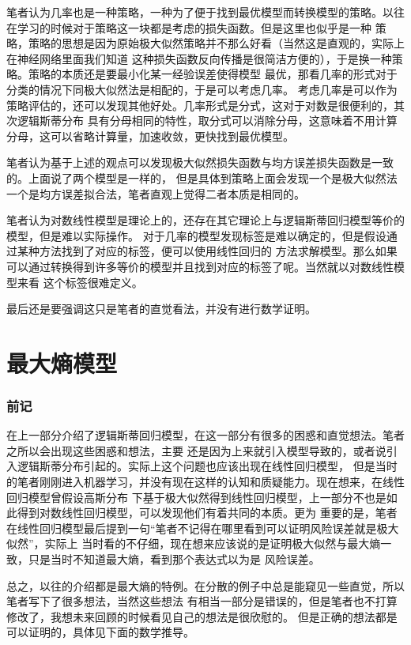 \documentclass{article}
\begin{document}
        笔者认为几率也是一种策略，一种为了便于找到最优模型而转换模型的策略。以往在学习的时候对于策略这一块都是考虑的损失函数。但是这里也似乎是一种
        策略，策略的思想是因为原始极大似然策略并不那么好看（当然这是直观的，实际上在神经网络里面我们知道
        这种损失函数反向传播是很简洁方便的），于是换一种策略。策略的本质还是要最小化某一经验误差使得模型
        最优，那看几率的形式对于分类的情况下同极大似然法是相配的，于是可以考虑几率。
        考虑几率是可以作为策略评估的，还可以发现其他好处。几率形式是分式，这对于对数是很便利的，其次逻辑斯蒂分布
        具有分母相同的特性，取分式可以消除分母，这意味着不用计算分母，这可以省略计算量，加速收敛，更快找到最优模型。

        笔者认为基于上述的观点可以发现极大似然损失函数与均方误差损失函数是一致的。上面说了两个模型是一样的，
        但是具体到策略上面会发现一个是极大似然法一个是均方误差拟合法，笔者直观上觉得二者本质是相同的。

        笔者认为对数线性模型是理论上的，还存在其它理论上与逻辑斯蒂回归模型等价的模型，但是难以实际操作。
        对于几率的模型发现标签是难以确定的，但是假设通过某种方法找到了对应的标签，便可以使用线性回归的
        方法求解模型。那么如果可以通过转换得到许多等价的模型并且找到对应的标签了呢。当然就以对数线性模型来看
        这个标签很难定义。
        
        最后还是要强调这只是笔者的直觉看法，并没有进行数学证明。

\part{最大熵模型}
    \section*{前记}
        在上一部分介绍了逻辑斯蒂回归模型，在这一部分有很多的困惑和直觉想法。笔者之所以会出现这些困惑和想法，主要
        还是因为上来就引入模型导致的，或者说引入逻辑斯蒂分布引起的。实际上这个问题也应该出现在线性回归模型，
        但是当时的笔者刚刚进入机器学习，并没有现在这样的认知和质疑能力。现在想来，在线性回归模型曾假设高斯分布
        下基于极大似然得到线性回归模型，上一部分不也是如此得到对数线性回归模型，可以发现他们有着共同的本质。更为
        重要的是，笔者在线性回归模型最后提到一句“笔者不记得在哪里看到可以证明风险误差就是极大似然”，实际上
        当时看的不仔细，现在想来应该说的是证明极大似然与最大熵一致，只是当时不知道最大熵，看到那个表达式以为是
        风险误差。

        总之，以往的介绍都是最大熵的特例。在分散的例子中总是能窥见一些直觉，所以笔者写下了很多想法，当然这些想法
        有相当一部分是错误的，但是笔者也不打算修改了，我想未来回顾的时候看见自己的想法是很欣慰的。
        但是正确的想法都是可以证明的，具体见下面的数学推导。
\end{document}
